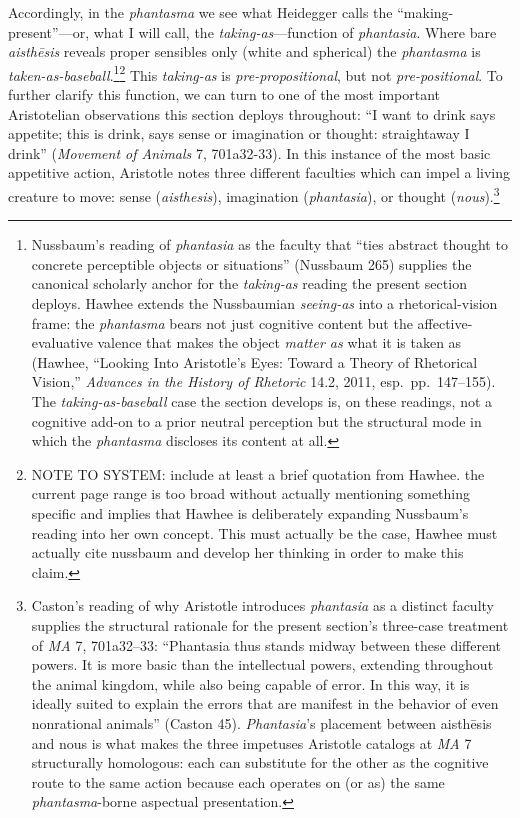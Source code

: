 \documentclass{article}
\begin{document}
Accordingly, in the \textit{phantasma} we see what Heidegger calls the ``making-present''---or, what I will call, the \textit{taking-as}---function of \textit{phantasia}. Where bare \textit{aisthēsis} reveals proper sensibles only (white and spherical) the \textit{phantasma} is \textit{taken-as-baseball}.\footnote{Nussbaum's reading of \textit{phantasia} as the faculty that ``ties abstract thought to concrete perceptible objects or situations'' (Nussbaum 265) supplies the canonical scholarly anchor for the \textit{taking-as} reading the present section deploys. Hawhee extends the Nussbaumian \textit{seeing-as} into a rhetorical-vision frame: the \textit{phantasma} bears not just cognitive content but the affective-evaluative valence that makes the object \textit{matter as} what it is taken as (Hawhee, ``Looking Into Aristotle's Eyes: Toward a Theory of Rhetorical Vision,'' \textit{Advances in the History of Rhetoric} 14.2, 2011, esp.~pp.~147--155). The \textit{taking-as-baseball} case the section develops is, on these readings, not a cognitive add-on to a prior neutral perception but the structural mode in which the \textit{phantasma} discloses its content at all.}\footnote{NOTE TO SYSTEM: include at least a brief quotation from Hawhee. the current page range is too broad without actually mentioning something specific and implies that Hawhee is deliberately expanding Nussbaum's reading into her own concept. This must actually be the case, Hawhee must actually cite nussbaum and develop her thinking in order to make this claim.} This \textit{taking-as} is \textit{pre-propositional}, but not \textit{pre-positional}. To further clarify this function, we can turn to one of the most important Aristotelian observations this section deploys throughout: ``I want to drink says appetite; this is drink, says sense or imagination or thought: straightaway I drink'' (\textit{Movement of Animals} 7, 701a32-33). In this instance of the most basic appetitive action, Aristotle notes three different faculties which can impel a living creature to move: sense (\textit{aisthesis}), imagination (\textit{phantasia}), or thought (\textit{nous}).\footnote{Caston's reading of why Aristotle introduces \textit{phantasia} as a distinct faculty supplies the structural rationale for the present section's three-case treatment of \textit{MA} 7, 701a32--33: ``Phantasia thus stands midway between these different powers. It is more basic than the intellectual powers, extending throughout the animal kingdom, while also being capable of error. In this way, it is ideally suited to explain the errors that are manifest in the behavior of even nonrational animals'' (Caston 45). \textit{Phantasia}'s placement between aisthēsis and nous is what makes the three impetuses Aristotle catalogs at \textit{MA} 7 structurally homologous: each can substitute for the other as the cognitive route to the same action because each operates on (or as) the same \textit{phantasma}-borne aspectual presentation.} 
\end{document}
